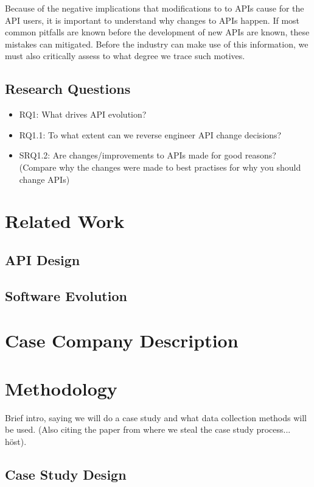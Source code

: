\documentclass[10pt,twocolumn]{article}
\begin{document}
Because of the negative implications that modifications to to APIs cause for the API users, it is important to understand why changes to APIs happen. If most common pitfalls are known before the development of new APIs are known, these mistakes can mitigated. Before the industry can make use of this information, we must also critically assess to what degree we trace such motives. 


\subsection{Research Questions}
\begin{itemize}
\item RQ1: What drives API evolution? 
\item RQ1.1: To what extent can we reverse engineer API change decisions?
\item SRQ1.2: Are changes/improvements to APIs made for good reasons? (Compare why the changes were made to best practises for why you should change APIs)
\end{itemize}


\section{Related Work}

\subsection{API Design}

\subsection{Software Evolution}



\section{Case Company Description}



\section{Methodology}
Brief intro, saying we will do a case study and what data collection methods will be used. (Also citing the paper from where we steal the case study process... höst).

\subsection{Case Study Design}
\end{document}
